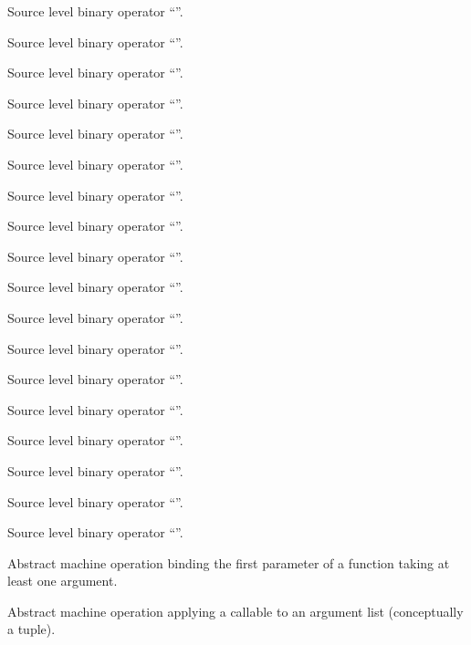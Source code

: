 Source level binary operator ``\code{\&\&}''.


Source level binary operator ``\code{||}''.

Source level binary operator ``\code{=}''.

Source level binary operator ``\code{+=}''.

Source level binary operator ``\code{-=}''.

Source level binary operator ``\code{*=}''.

Source level binary operator ``\code{/=}''.

Source level binary operator ``\code{\%=}''.

Source level binary operator ``\code{\&=}''.

Source level binary operator ``\code{|=}''.

Source level binary operator ``\code{\^=}''.

Source level binary operator ``\code{<<=}''.

Source level binary operator ``\code{>>=}''.

Source level binary operator ``\code{,}''.

Source level binary operator ``''.

Source level binary operator ``\code{->}''.

Source level binary operator ``''.

Source level binary operator ``\code{->*}''.

Abstract machine operation binding the first parameter of a function taking at least one argument.

Abstract machine operation applying a callable to an argument list (conceptually a tuple).

